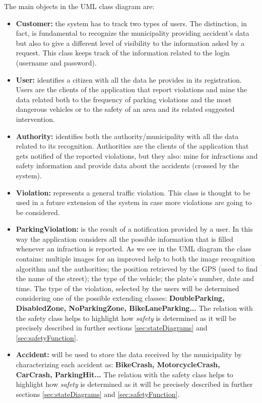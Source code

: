 	The main objects in the UML class diagram are:
	\begin{itemize}
		\item \textbf{Customer:} the system has to track two types of users. The distinction, in fact, is fundamental to recognize the municipality providing accident's data but also to give a different level of visibility to the information asked by a request. This class keeps track of the information related to the login (username and password).
		
		\item \textbf{User:} identifies a citizen with all the data he provides in its registration. Users are the clients of the application that report violations and mine the data related both to the frequency of parking violations and the most dangerous vehicles or to the safety of an area and its related suggested intervention.
		
		\item \textbf{Authority:} identifies both the authority/municipality with all the data related to its recognition. Authorities are the clients of the application that gets notified of the reported violations, but they also: mine for infractions and safety information and provide data about the accidents (crossed by the system).
		
		\item \textbf{Violation:} represents a general traffic violation. This class is thought to be used in a future extension of the system in case more violations are going to be considered.
		
		\item \textbf{ParkingViolation:} is the result of a notification provided by a user. In this way the application considers all the possible information that is filled whenever an infraction is reported. As we see in the UML diagram the class contains: multiple images for an improved help to both the image recognition algorithm and the authorities; the position retrieved by the GPS (used to find the name of the street); the type of the vehicle; the plate's number, date and time. The type of the violation, selected by the users will be determined considering one of the possible extending classes: \textbf{DoubleParking, DisabledZone, NoParkingZone, BikeLaneParking...} The relation with the safety class helps to highlight how \emph{safety} is determined as it will be precisely described in further sections \ref{sec:stateDiagrams} and \ref{sec:safetyFunction}.
		
		\item \textbf{Accident:} will be used to store the data received by the municipality by characterizing each accident as: \textbf{BikeCrash, MotorcycleCrash, CarCrash, ParkingHit...} The relation with the safety class helps to highlight how \emph{safety} is determined as it will be precisely described in further sections \ref{sec:stateDiagrams} and \ref{sec:safetyFunction}.
		

\end{itemize}
